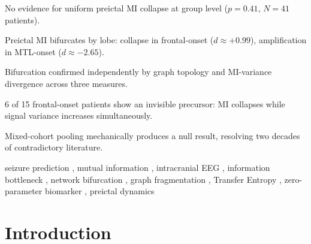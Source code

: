 \documentclass[final,5p,times,twocolumn]{elsarticle}
\begin{document}
\begin{frontmatter}
\begin{highlights}
  \item No evidence for uniform preictal MI collapse at group level
        ($p = 0.41$, $N = 41$ patients).
  \item Preictal MI bifurcates by lobe: collapse in frontal-onset
        ($d \approx +0.99$), amplification in MTL-onset ($d \approx
        -2.65$).
  \item Bifurcation confirmed independently by graph topology and
        MI-variance divergence across three measures.
  \item 6 of 15 frontal-onset patients show an invisible precursor:
        MI collapses while signal variance increases simultaneously.
  \item Mixed-cohort pooling mechanically produces a null result,
        resolving two decades of contradictory literature.
\end{highlights}

\begin{keyword}
seizure prediction \sep
mutual information \sep
intracranial EEG \sep
information bottleneck \sep
network bifurcation \sep
graph fragmentation \sep
Transfer Entropy \sep
zero-parameter biomarker \sep
preictal dynamics
\end{keyword}

\end{frontmatter}

\section{Introduction}
\label{sec:intro}
\end{document}
